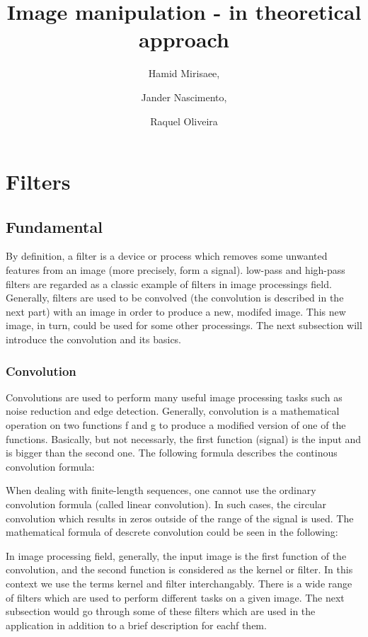 \documentclass{article}
\begin{document}
\title{Image manipulation - in theoretical approach}

\author{Hamid Mirisaee,
\and Jander Nascimento, 
\and Raquel Oliveira}

\maketitle

\tableofcontents

\section{Filters}

	\subsection{Fundamental}

		By definition, a filter is a device or process which removes some unwanted features from an image (more precisely, form a signal).
		low-pass and high-pass filters are regarded as a classic example of filters in image processings field. Generally, filters are used to be convolved 
		(the convolution is described in the next part) with an image in order to produce a new, modifed image. This new image, in turn, could
		be used for some other processings. The next subsection will introduce the convolution and its basics.
		
		\subsubsection{Convolution}

			Convolutions are used to perform many useful image processing tasks such as noise reduction and edge detection. Generally,
			convolution is a mathematical operation on two functions f and g to produce a modified version of one of the functions.
			Basically, but not necessarly, the first function (signal) is the input and is bigger than the second one.
			The following formula describes the continous convolution formula:
			
			
			When dealing with finite-length sequences, one cannot use the ordinary convolution formula (called linear convolution).
			In such cases, the circular convolution which results in zeros outside of the range of the signal is used. The mathematical formula of descrete 
			convolution could be seen in the following:
			
			In image processing field, generally, the input image is the first function of the convolution, and the second 
			function is considered as the kernel or filter.
			In this context we use the terms kernel and filter interchangably.
			There is a wide range of filters which are used to perform different tasks on a given image. The next subsection would go through some of these 
			filters which are used in the application in addition to a brief description for eachf them.
\end{document}

